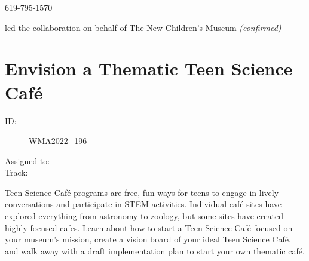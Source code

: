 \documentclass{report}
\begin{document}
                619-795-1570\newline

                led the collaboration on behalf of The New Children's Museum
                \emph{ (confirmed) }
              

              
        
          \newpage
          \section{ Envision a Thematic Teen Science Café  }
            \begin{description}
              \item [ID:]
              WMA2022\_196

              \item [Assigned to:]
                \item [Track:]
              \end{description}

              Teen Science Café programs are free, fun ways for teens to engage in lively conversations and participate in STEM activities. Individual café sites have explored everything from astronomy to zoology, but some sites have created highly focused cafes. Learn about how to start a Teen Science Café focused on your museum’s mission, create a vision board of your ideal Teen Science Café, and walk away with a draft implementation plan to start your own thematic café.
\end{document}
